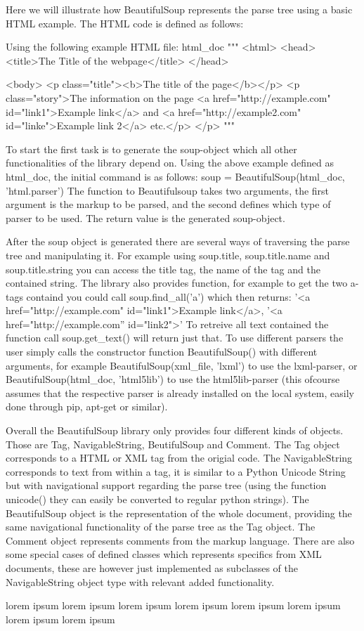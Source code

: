 \documentclass[10pt]{article}
\begin{document}
\begin{BeautifulSoup4 Examples}
Here we will illustrate how BeautifulSoup represents the parse tree using a basic HTML example. The HTML code is defined as follows:

Using the following example HTML file:
html_doc """
<html>
<head>
<title>The Title of the webpage</title>
</head>

<body>
<p class="title"><b>The title of the page</b></p>
<p class="story">The information on the page 
<a href="http://example.com" id="link1">Example link</a> and 
<a href="http://example2.com" id="linke">Example link 2</a> etc.</p>
</p>
"""

To start the first task is to generate the soup-object which all other functionalities of the library depend on. Using the above example defined as html_doc, the initial command is as follows:
soup = BeautifulSoup(html_doc, 'html.parser')
The function to Beautifulsoup takes two arguments, the first argument is the markup to be parsed, and the second defines which type of parser to be used. The return value is the generated soup-object.

After the soup object is generated there are several ways of traversing the parse tree and manipulating it. For example using soup.title, soup.title.name and soup.title.string you can access the title tag, the name of the tag and the contained string. The library also provides function, for example to get the two a-tags containd you could call soup.find_all('a') which then returns:
'<a href="http://example.com" id="link1">Example link</a>, '<a href="http://example.com'' id="link2">'
To retreive all text contained the function call soup.get_text() will return just that.
To use different parsers the user simply calls the constructor function BeautifulSoup() with different arguments, for example BeautifulSoup(xml_file, 'lxml') to use the lxml-parser, or BeautifulSoup(html_doc, 'html5lib') to use the html5lib-parser (this ofcourse assumes that the respective parser is already installed on the local system, easily done through pip, apt-get or similar).

Overall the BeautifulSoup library only provides four different kinds of objects. Those are Tag, NavigableString, BeutifulSoup and Comment. The Tag object corresponds to a HTML or XML tag from the origial code. The NavigableString corresponds to text from within a tag, it is similar to a Python Unicode String but with navigational support regarding the parse tree (using the function unicode() they can easily be converted to regular python strings). The BeautifulSoup object is the representation of the whole document, providing the same navigational functionality of the parse tree as the Tag object. The Comment object represents comments from the markup language. There are also some special cases of defined classes which represents specifics from XML documents, these are however just implemented as subclasses of the NavigableString object type with relevant added functionality. 

\end{BeautifulSoup4 Examples}

lorem ipsum lorem ipsum lorem ipsum lorem ipsum lorem ipsum lorem ipsum lorem ipsum lorem ipsum
\end{document}
